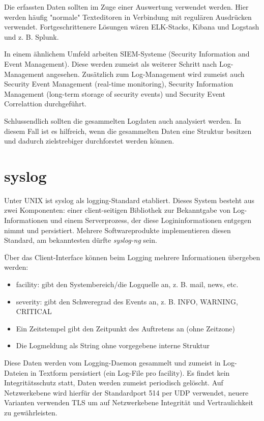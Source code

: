 Die erfassten Daten sollten im Zuge einer Auswertung verwendet werden. Hier werden häufig "normale" Texteditoren in Verbindung mit regulären Ausdrücken verwendet. Fortgeschrittenere Lösungen wären ELK-Stacks, Kibana und Logstash und z. B. Splunk.

In einem ähnlichem Umfeld arbeiten SIEM-Systeme (Security Information and Event Management). Diese werden zumeist als weiterer Schritt nach Log-Management angesehen. Zusätzlich zum Log-Management wird zumeist auch Security Event Management (real-time monitoring), Security Information Management (long-term storage of security events) und Security Event Correlattion durchgeführt.

Schlussendlich sollten die gesammelten Logdaten auch analysiert werden. In diesem Fall ist es hilfreich, wenn die gesammelten Daten eine Struktur besitzen und dadurch zielstrebiger durchforstet werden können.

\section{syslog}

Unter UNIX ist syslog als logging-Standard etabliert. Dieses System besteht aus zwei Komponenten: einer client-seitigen Bibliothek zur Bekanntgabe von Log-Informationen und einem Serverprozess, der diese Logininformationen entgegen nimmt und persistiert. Mehrere Softwareprodukte implementieren diesen Standard, am bekanntesten dürfte \textit{syslog-ng} sein.

Über das Client-Interface können beim Logging mehrere Informationen übergeben werden:

\begin{itemize}
	\item facility: gibt den Systembereich/die Logquelle an, z. B. mail, news, etc.
	\item severity: gibt den Schweregrad des Events an, z. B. INFO, WARNING, CRITICAL
	\item Ein Zeitstempel gibt den Zeitpunkt des Auftretens an (ohne Zeitzone)
	\item Die Logmeldung als String ohne vorgegebene interne Struktur
\end{itemize}

Diese Daten werden vom Logging-Daemon gesammelt und zumeist in Log-Dateien in Textform persistiert (ein Log-File pro facility). Es findet kein Integritätsschutz statt, Daten werden zumeist periodisch gelöscht. Auf Netzwerkebene wird hierfür der Standardport 514 per UDP verwendet, neuere Varianten verwenden TLS um auf Netzwerkebene Integrität und Vertraulichkeit zu gewährleisten.

